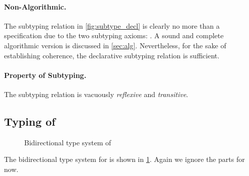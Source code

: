 \paragraph{Non-Algorithmic.}
The subtyping relation in \cref{fig:subtype_decl} is clearly no more than a
specification due to the two subtyping axioms: . A sound
and complete algorithmic version is discussed in \cref{sec:alg}. Nevertheless,
for the sake of establishing coherence, the declarative subtyping relation is
sufficient.


\paragraph{Property of Subtyping.}
The subtyping relation is vacuously \textit{reflexive} and \textit{transitive}.



\subsection{Typing of \namee}


\begin{figure}[t]
  \centering
{}
  \caption{Bidirectional type system of \namee}
  \label{fig:type_system}
\end{figure}

\renewcommand{\rulehl}[1]{#1}



The bidirectional type system for \namee is shown in \cref{fig:type_system}.
Again we ignore the  parts for now.


\begin{comment}
Unlike the development of \oname, which first presents a type assignment
specification, \Cref{fig:type_system} directly present the bidirectional type
system of \namee.
Unfortunately, we found that their declarative type
system is incoherent in nature (even with all the syntactic restrictions).
\jeremy{perhaps add a counter example somewhere?} Again, the reader is advised
to continue ignoring the gray-shaded parts until \cref{sec:elaboration}.
\tom{The above story is a bit confusing to me. Is it the case that the
     \oname paper already was aware of the coherence problem with its
     declarative type system and for that reason (and inference) presented
     a bidirection type system as well? If so, that's not clear.} \jeremy{I
     remember at one point Bruno and I believed the declarative system is
     coherent, it's just hard to prove. Then I found a counterexample. That was
     after \tname paper.  }
\end{comment}


